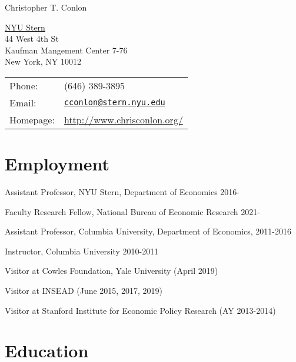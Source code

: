 \documentclass[letterpaper]{article}
\def\name{Christopher T. Conlon}
\renewenvironment{itemize}{
  \begin{list}{}{
    \setlength{\leftmargin}{1.5em}
  }
}{
  \end{list}
}
\begin{document}
{\huge \name}


\vspace{0.25in}

\begin{minipage}{0.45\linewidth}
  \href{http://www.chrisconlon.org/}{NYU Stern} \\
  44 West 4th St \\
  Kaufman Mangement Center 7-76 \\
  New York, NY 10012
\end{minipage}
\begin{minipage}{0.45\linewidth}
  \begin{tabular}{ll}
    Phone: & (646) 389-3895 \\
     Email: & \href{mailto:cconlon@stern.nyu.edu}{\tt cconlon@stern.nyu.edu} \\
    Homepage: & \url{http://www.chrisconlon.org/} \\
  \end{tabular}
\end{minipage}

\section*{Employment}

\begin{itemize}
\item Assistant Professor, NYU Stern, Department of Economics 2016-
\item Faculty Research Fellow, National Bureau of Economic Research 2021-
\item Assistant Professor, Columbia University, Department of Economics, 2011-2016
\item Instructor, Columbia University 2010-2011
\item Visitor at Cowles Foundation, Yale University (April 2019)
\item Visitor at INSEAD (June 2015, 2017, 2019)
\item Visitor at Stanford Institute for Economic Policy Research (AY 2013-2014)
\end{itemize}



\section*{Education}
\end{document}
